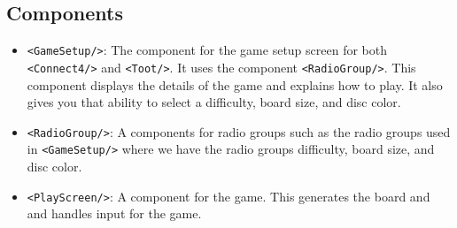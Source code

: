 \documentclass{article}
\begin{document}
\subsection{Components}
\begin{itemize}
  \item \texttt{<GameSetup/>}: The component for the game setup screen for both  \texttt{<Connect4/>} and \texttt{<Toot/>}. It uses the component \texttt{<RadioGroup/>}. This component displays the details of the game and explains how to play. It also gives you that ability to select a difficulty, board size, and disc color. 
  \item \texttt{<RadioGroup/>}: A components for radio groups such as the radio groups used in \texttt{<GameSetup/>} where we have the radio groups difficulty, board size, and disc color. 
  \item \texttt{<PlayScreen/>}: A component for the game. This generates the board and and handles input for the game.
\end{itemize}
\end{document}
